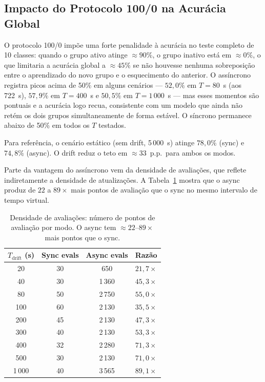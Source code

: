 \documentclass[12pt, a4paper]{article}
\begin{document}
\subsection{Impacto do Protocolo 100/0 na Acurácia Global}

O protocolo 100/0 impõe uma forte penalidade à acurácia no teste completo de 10
classes: quando o grupo ativo atinge $\approx 90\%$, o grupo inativo está em
$\approx 0\%$, o que limitaria a acurácia global a $\approx 45\%$ se não
houvesse nenhuma sobreposição entre o aprendizado do novo grupo e o
esquecimento do anterior. O assíncrono registra picos acima de 50\% em alguns
cenários --- $52{,}0\%$ em $T = 80$~s (aos 722~s), $57{,}9\%$ em
$T = 400$~s e $50{,}5\%$ em $T = 1\,000$~s --- mas esses momentos são
pontuais e a acurácia logo recua, consistente com um modelo que ainda não
retém os dois grupos simultaneamente de forma estável. O síncrono permanece
abaixo de 50\% em todos os $T$ testados.

Para referência, o cenário estático (sem drift, 5\,000~s) atinge $78{,}0\%$
(sync) e $74{,}8\%$ (async). O drift reduz o teto em $\approx 33$~p.p.\ para
ambos os modos.

Parte da vantagem do assíncrono vem da densidade de avaliações, que reflete
indiretamente a densidade de atualizações. A Tabela~\ref{tab:eval_density}
mostra que o async produz de $22$ a $89{\times}$ mais pontos de avaliação que
o sync no mesmo intervalo de tempo virtual.

\begin{table}[H]
\centering
\caption{Densidade de avaliações: número de pontos de avaliação por modo.
  O async tem $\approx 22$--$89{\times}$ mais pontos que o sync.}
\label{tab:eval_density}
\renewcommand{\arraystretch}{1.2}
\begin{tabular}{cccc}
\toprule
$T_{\text{drift}}$ (s) & Sync evals & Async evals & Razão \\
\midrule
20   & 30   & 650   & $21{,}7{\times}$ \\
40   & 30   & 1\,360 & $45{,}3{\times}$ \\
80   & 50   & 2\,750 & $55{,}0{\times}$ \\
100  & 60   & 2\,130 & $35{,}5{\times}$ \\
200  & 45   & 2\,130 & $47{,}3{\times}$ \\
300  & 40   & 2\,130 & $53{,}3{\times}$ \\
400  & 32   & 2\,280 & $71{,}3{\times}$ \\
500  & 30   & 2\,130 & $71{,}0{\times}$ \\
1\,000 & 40   & 3\,565 & $89{,}1{\times}$ \\
\bottomrule
\end{tabular}
\end{table}
\end{document}
